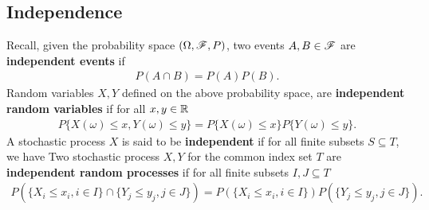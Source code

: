\documentclass[letterpaper,10pt,english]{article}
\begin{document}
\subsection{Independence}
Recall, given the probability space $(\Omega, \mathscr{F}, P)$, two events $A, B \in \mathscr{F}$ are \textbf{independent events} if 
\begin{align*}
P(A\cap B) = P(A)P(B).
\end{align*}
Random variables $X,Y$ defined on the above probability space, are \textbf{independent random variables} if for all $x,y \in \mathbb{R}$
\begin{align*}
P\{X(\omega) \leq x, Y(\omega) \leq y\} = P\{X(\omega) \leq x\}P\{Y(\omega) \leq y\}.
\end{align*}
A stochastic process $X$ is said to be \textbf{independent} if for all finite subsets $S \subseteq T$, we have
Two stochastic process $X, Y$ for the common index set $T$ are \textbf{independent random processes} if for all %
finite subsets $I, J \subseteq T$ %
\begin{align*}
P\left(\{X_i \leq x_i, i \in I \}\cap\{Y_j \leq y_j, j \in J\}\right) = P\left(\{X_i \leq x_i, i \in I\}\right)P\left(\{Y_j \leq y_j, j \in J\}\right).
\end{align*}
\end{document}
